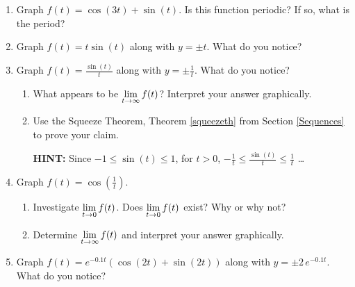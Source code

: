 \documentclass{ximera}
\begin{document}
\begin{enumerate}

\setcounter{enumi}{\value{HW}}

\item  Graph $f(t) = \cos(3t) + \sin(t)$.  Is this function periodic?  If so, what is the period? \label{exploregraphsfirst}

\smallskip

\item  Graph $f(t) = t \sin(t)$ along with  $y = \pm t$. What do you notice? 

\smallskip

\item  Graph $f(t) = \frac{\sin(t)}{t}$ along with  $y = \pm \frac{1}{t}$.   What do you notice?

\begin{enumerate}

\item What appears to be $\ds{\lim_{t \rightarrow \infty} f(t)}$?    Interpret your answer graphically.

\smallskip

\item  Use the Squeeze Theorem, Theorem \ref{squeezeth} from Section \ref{Sequences} to prove your claim.  

\smallskip

\textbf{HINT:}  Since $-1 \leq \sin(t) \leq 1$, for $t>0$, $-\frac{1}{t} \leq \frac{\sin(t)}{t} \leq \frac{1}{t}$ \ldots

\end{enumerate}

\smallskip


\item  Graph $f(t) = \cos\left(\frac{1}{t}\right)$.  

\begin{enumerate}

\item Investigate  $\ds{\lim_{t \rightarrow 0} f(t)}$.  Does $\ds{\lim_{t \rightarrow 0} f(t)}$ exist?  Why or why not?

\smallskip

\item  Determine $\ds{\lim_{t \rightarrow \infty} f(t)}$ and interpret your answer graphically.

\end{enumerate}

\smallskip

\item  Graph $f(t) = e^{-0.1t} \left( \cos(2t) + \sin(2t)\right)$ along with $y = \pm 2 \, e^{-0.1t}$. What do you notice?  \label{exploregraphslast}


\end{enumerate}
\end{document}
